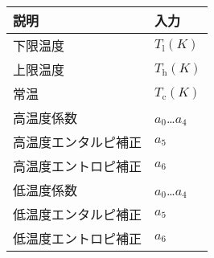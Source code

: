 \begin{tabular}{ll}
 説明 & 入力 \\
 \hline
 下限温度 & $T_{\mathrm{l}} \unit{(K)}$ \\
 上限温度 & $T_{\mathrm{h}} \unit{(K)}$ \\
 常温 & $T_{\mathrm{c}} \unit{(K)}$ \\
 高温度係数 & $a_{0}$\ldots $a_{4}$ \\
 高温度エンタルピ補正 & $a_{5}$ \\
 高温度エントロピ補正 & $a_{6}$ \\
 低温度係数 & $a_{0}$\ldots $a_{4}$ \\
 低温度エンタルピ補正 & $a_{5}$ \\
 低温度エントロピ補正 & $a_{6}$ \\
 \hline
\end{tabular}
